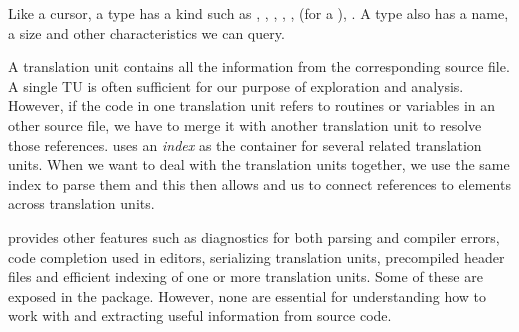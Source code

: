 Like a cursor, a \libclang{} type has a kind such as ,
, ,
, ,
 (for a ),
.  A type also has a name, a size and other
characteristics we can query.


A translation unit contains all the information from the corresponding
source file.  A single TU is often sufficient for our purpose of
exploration and analysis. However, if the code in one translation unit
refers to routines or variables in an other source file, we have to
merge it with another translation unit to resolve those references.
\libclang{} uses an \textit{index} as the container for several
related translation units.  When we want to deal with the translation
units together, we use the same index to parse them and this then
allows \libclang{} and us to connect references to elements across
translation units.


\libclang{} provides other features such as diagnostics for both parsing
and compiler errors, code completion used in editors, serializing
translation units, precompiled header files and efficient indexing of
one or more translation units.  Some of these are exposed in the 
package. However, none are essential for understanding how to work
with \libclang{} and extracting useful information from source code.




